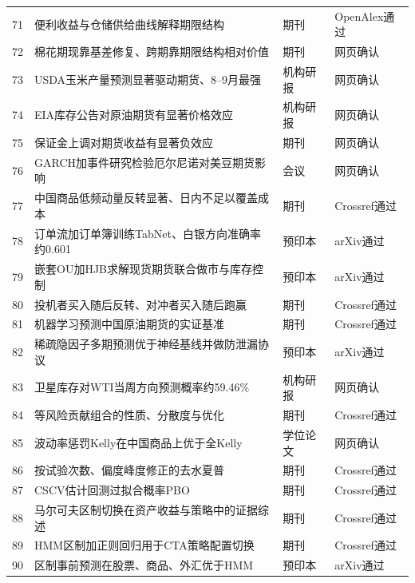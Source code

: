 \documentclass[12pt,a4paper]{ctexart}
\begin{document}
{\begin{longtable}{p{28.45pt}p{244.69pt}p{48.37pt}p{85.36pt}}
71 & 便利收益与仓储供给曲线解释期限结构 & 期刊 & OpenAlex通过 \\
72 & 棉花期现靠基差修复、跨期靠期限结构相对价值 & 期刊 & 网页确认 \\
73 & USDA玉米产量预测显著驱动期货、8–9月最强 & 机构研报 & 网页确认 \\
74 & EIA库存公告对原油期货有显著价格效应 & 机构研报 & 网页确认 \\
75 & 保证金上调对期货收益有显著负效应 & 期刊 & 网页确认 \\
76 & GARCH加事件研究检验厄尔尼诺对美豆期货影响 & 会议 & 网页确认 \\
77 & 中国商品低频动量反转显著、日内不足以覆盖成本 & 期刊 & Crossref通过 \\
78 & 订单流加订单簿训练TabNet、白银方向准确率约0.601 & 预印本 & arXiv通过 \\
79 & 嵌套OU加HJB求解现货期货联合做市与库存控制 & 预印本 & arXiv通过 \\
80 & 投机者买入随后反转、对冲者买入随后跑赢 & 期刊 & Crossref通过 \\
81 & 机器学习预测中国原油期货的实证基准 & 期刊 & Crossref通过 \\
82 & 稀疏隐因子多期预测优于神经基线并做防泄漏协议 & 预印本 & arXiv通过 \\
83 & 卫星库存对WTI当周方向预测概率约59.46\% & 机构研报 & 网页确认 \\
84 & 等风险贡献组合的性质、分散度与优化 & 期刊 & Crossref通过 \\
85 & 波动率惩罚Kelly在中国商品上优于全Kelly & 学位论文 & 网页确认 \\
86 & 按试验次数、偏度峰度修正的去水夏普 & 期刊 & Crossref通过 \\
87 & CSCV估计回测过拟合概率PBO & 期刊 & Crossref通过 \\
88 & 马尔可夫区制切换在资产收益与策略中的证据综述 & 期刊 & Crossref通过 \\
89 & HMM区制加正则回归用于CTA策略配置切换 & 期刊 & Crossref通过 \\
90 & 区制事前预测在股票、商品、外汇优于HMM & 预印本 & arXiv通过 \\
\bottomrule
\end{longtable}}


\newpage
\newpage
\end{document}
